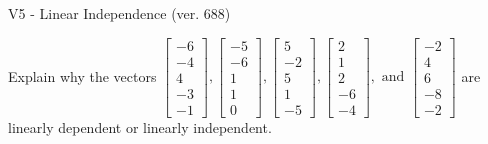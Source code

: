 \begin{exercise}
  \begin{exerciseTitle}V5 - Linear Independence (ver. 688)\end{exerciseTitle}
  \begin{exerciseStatement}
    Explain why the vectors \(\left[\begin{array}{r}
-6 \\
-4 \\
4 \\
-3 \\
-1
\end{array}\right] , \left[\begin{array}{r}
-5 \\
-6 \\
1 \\
1 \\
0
\end{array}\right] , \left[\begin{array}{r}
5 \\
-2 \\
5 \\
1 \\
-5
\end{array}\right] , \left[\begin{array}{r}
2 \\
1 \\
2 \\
-6 \\
-4
\end{array}\right] , \text{ and } \left[\begin{array}{r}
-2 \\
4 \\
6 \\
-8 \\
-2
\end{array}\right]\) are linearly dependent or linearly independent.	



\end{exerciseStatement}
\end{exercise}
